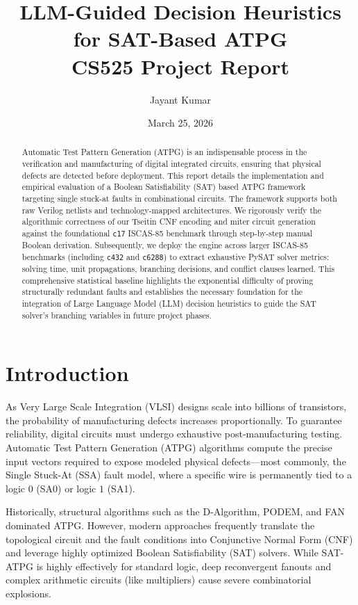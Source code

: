 \documentclass[11pt,a4paper]{article}
\title{
    \vspace{-1.5cm}
    \textbf{LLM-Guided Decision Heuristics for SAT-Based ATPG}\\
    \large CS525 Project Report
}
\author{Jayant Kumar}
\date{March 25, 2026}
\begin{document}
\maketitle

\begin{abstract}
Automatic Test Pattern Generation (ATPG) is an indispensable process in the verification and manufacturing of digital integrated circuits, ensuring that physical defects are detected before deployment. This report details the implementation and empirical evaluation of a Boolean Satisfiability (SAT) based ATPG framework targeting single stuck-at faults in combinational circuits. The framework supports both raw Verilog netlists and technology-mapped architectures. We rigorously verify the algorithmic correctness of our Tseitin CNF encoding and miter circuit generation against the foundational \texttt{c17} ISCAS-85 benchmark through step-by-step manual Boolean derivation. Subsequently, we deploy the engine across larger ISCAS-85 benchmarks (including \texttt{c432} and \texttt{c6288}) to extract exhaustive PySAT solver metrics: solving time, unit propagations, branching decisions, and conflict clauses learned. This comprehensive statistical baseline highlights the exponential difficulty of proving structurally redundant faults and establishes the necessary foundation for the integration of Large Language Model (LLM) decision heuristics to guide the SAT solver's branching variables in future project phases.
\end{abstract}

\tableofcontents
\newpage

\section{Introduction}
As Very Large Scale Integration (VLSI) designs scale into billions of transistors, the probability of manufacturing defects increases proportionally. To guarantee reliability, digital circuits must undergo exhaustive post-manufacturing testing. Automatic Test Pattern Generation (ATPG) algorithms compute the precise input vectors required to expose modeled physical defects---most commonly, the Single Stuck-At (SSA) fault model, where a specific wire is permanently tied to a logic $0$ (SA0) or logic $1$ (SA1).

Historically, structural algorithms such as the D-Algorithm, PODEM, and FAN dominated ATPG. However, modern approaches frequently translate the topological circuit and the fault conditions into Conjunctive Normal Form (CNF) and leverage highly optimized Boolean Satisfiability (SAT) solvers. While SAT-ATPG is highly effectively for standard logic, deep reconvergent fanouts and complex arithmetic circuits (like multipliers) cause severe combinatorial explosions. 
\end{document}
